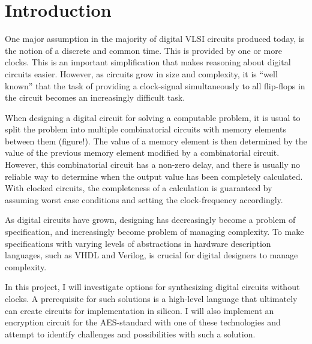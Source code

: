 \section{Introduction}

One major assumption in the majority of digital VLSI circuits produced
today, is the notion of a discrete and common time. This is provided
by one or more clocks. This is an important simplification that makes
reasoning about digital circuits easier. However, as circuits grow in
size and complexity, it is ``well known'' \cite[pp. 5]{sparso} that
the task of providing a clock-signal simultaneously to all flip-flops
in the circuit becomes an increasingly difficult task.

When designing a digital circuit for solving a computable problem, it
is usual to split the problem into multiple combinatorial circuits
with memory elements between them (figure!). The value of a memory
element is then determined by the value of the previous memory element
modified by a combinatorial circuit. However, this combinatorial
circuit has a non-zero delay, and there is usually no reliable way to
determine when the output value has been completely calculated. With
clocked circuits, the completeness of a calculation is guaranteed by
assuming worst case conditions and setting the clock-frequency
accordingly.

As digital circuits have grown, designing has decreasingly become a
problem of specification, and increasingly become problem of managing
complexity. To make specifications with varying levels of abstractions
in hardware description languages, such as VHDL and Verilog, is
crucial for digital designers to manage complexity.

In this project, I will investigate options for synthesizing digital
circuits without clocks. A prerequisite for such solutions is a
high-level language that ultimately can create circuits for
implementation in silicon. I will also implement an encryption circuit
for the AES-standard with one of these technologies and attempt to
identify challenges and possibilities with such a solution.

